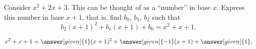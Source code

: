 \documentclass[nooutcomes]{ximera}
\begin{document}
\begin{problem}
Consider $x^2 + 2x + 3$.  This can be thought of as a ``number'' in base $x$.  Express this number in base $x+1$, that is, find $b_0$, $b_1$, $b_2$ such that 
\[
b_2(x+1)^2 + b_1(x+1) + b_0 = x^2 + x + 1.
\]
\begin{prompt}
\[
x^2 + x + 1 = \answer[given]{1}(x+1)^2 + \answer[given]{-1}(x+1) + \answer[given]{1}.
\]
\end{prompt}
\end{problem}
\end{document}
